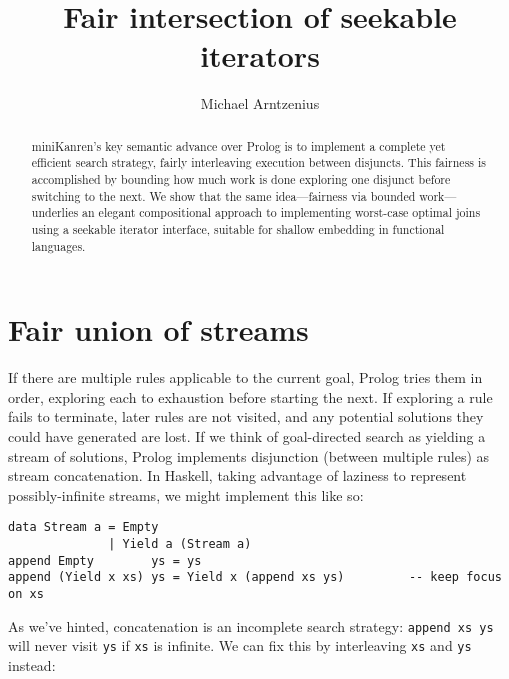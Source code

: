 \documentclass[acmsmall,screen,review,anonymous,dvipsnames,svgnames]{acmart}
\title{Fair intersection of seekable iterators}
\author{Michael Arntzenius}
\affiliation{%
	\institution{UC Berkeley}
	\city{Berkeley}
	\state{CA}
	\country{USA}
}
\newcommand\ttt\texttt
\begin{document}
\begin{abstract}
  {miniKanren}'s key semantic advance over Prolog is to implement a complete yet efficient search strategy, fairly interleaving execution between disjuncts.
  This fairness is accomplished by bounding how much work is done exploring one disjunct before switching to the next.
  We show that the same idea---fairness via bounded work---underlies an elegant compositional approach to implementing worst-case optimal joins using a seekable iterator interface, suitable for shallow embedding in functional languages.
\end{abstract}

\maketitle

\section{Fair union of streams}

If there are multiple rules applicable to the current goal, Prolog tries them in order, exploring each to exhaustion before starting the next.
If exploring a rule fails to terminate, later rules are not visited, and any potential solutions they could have generated are lost.
If we think of goal-directed search as yielding a stream of solutions, Prolog implements disjunction (between multiple rules) as stream concatenation.
In Haskell, taking advantage of laziness to represent possibly-infinite streams, we might implement this like so:

\begin{verbatim}
data Stream a = Empty
              | Yield a (Stream a)
append Empty        ys = ys
append (Yield x xs) ys = Yield x (append xs ys)         -- keep focus on xs
\end{verbatim}

\noindent
As we've hinted, concatenation is an incomplete search strategy: \ttt{append xs ys} will never visit \ttt{ys} if \ttt{xs} is infinite.
We can fix this by interleaving \ttt{xs} and \ttt{ys} instead:
\end{document}
